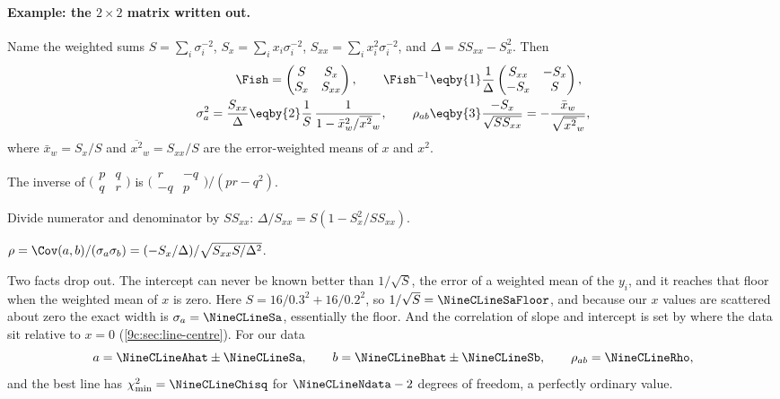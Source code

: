 \paragraph{Example: the $2\times2$ matrix written out.} Name the weighted sums
$S=\sum_i\sigma_i^{-2}$, $S_x=\sum_ix_i\sigma_i^{-2}$, $S_{xx}=\sum_ix_i^2\sigma_i^{-2}$, and
$\Delta=SS_{xx}-S_x^2$. Then
\begin{align}
  \Fish=\begin{pmatrix}S&S_x\\S_x&S_{xx}\end{pmatrix},
  \qquad
  \Fish^{-1}
  &\eqby{1}\frac1\Delta\begin{pmatrix}S_{xx}&-S_x\\-S_x&S\end{pmatrix},
  \nonumber\\
  \sigma_a^2=\frac{S_{xx}}{\Delta}\eqby{2}\frac{1}{S}\,\frac{1}{1-\bar x_w^2/\overline{x^2}_w},
  \qquad
  \rho_{ab}&\eqby{3}\frac{-S_x}{\sqrt{SS_{xx}}}=-\frac{\bar x_w}{\sqrt{\overline{x^2}_w}},
  \label{9c:eq:line-2x2}
\end{align}
where $\bar x_w=S_x/S$ and $\overline{x^2}_w=S_{xx}/S$ are the error-weighted means of $x$ and
$x^2$.
\begin{explain}
  \item The inverse of $\bigl(\begin{smallmatrix}p&q\\q&r\end{smallmatrix}\bigr)$ is
        $\bigl(\begin{smallmatrix}r&-q\\-q&p\end{smallmatrix}\bigr)/(pr-q^2)$.
  \item Divide numerator and denominator by $SS_{xx}$: $\Delta/S_{xx}=S(1-S_x^2/SS_{xx})$.
  \item $\rho=\Cov(a,b)/(\sigma_a\sigma_b)=(-S_x/\Delta)/\sqrt{S_{xx}S/\Delta^2}$.
\end{explain}
Two facts drop out. The intercept can never be known better than $1/\sqrt S$, the error of a
weighted mean of the $y_i$, and it reaches that floor when the weighted mean of $x$ is zero. Here
$S=16/0.3^2+16/0.2^2$, so $1/\sqrt S=\NineCLineSaFloor$, and because our $x$ values are scattered
about zero the exact width is $\sigma_a=\NineCLineSa$, essentially the floor. And the correlation of
slope and intercept is set by where the data sit relative to $x=0$ (\cref{9c:sec:line-centre}). For our data
\[
  a=\NineCLineAhat\pm\NineCLineSa,\qquad b=\NineCLineBhat\pm\NineCLineSb,\qquad
  \rho_{ab}=\NineCLineRho,
\]
and the best line has $\chi^2_{\min}=\NineCLineChisq$ for $\NineCLineNdata-2$ degrees of freedom, a
perfectly ordinary value.


